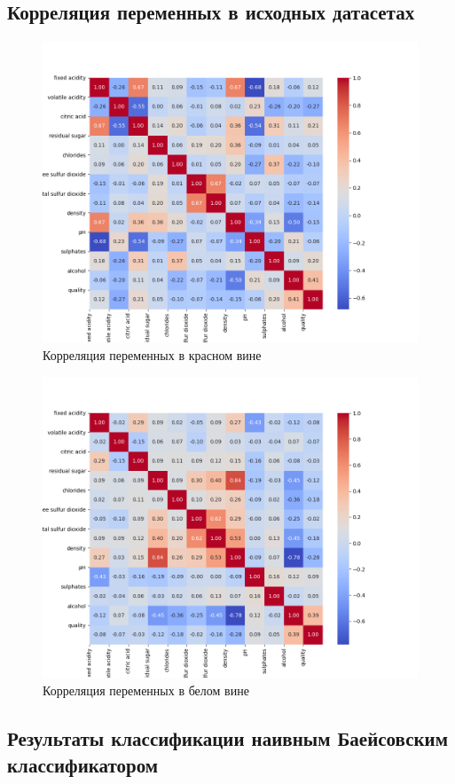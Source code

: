 \documentclass{article}
\begin{document}
\subsection{Корреляция переменных в исходных датасетах}
\begin{figure}[H]
		\centering
		\includegraphics[width = 15cm, height = 9cm]{red_cor.png}
		\caption{Корреляция переменных в красном вине}
	\end{figure}
	
\begin{figure}[H]
		\centering
		\includegraphics[width = 15cm, height = 9cm]{white_cor.png}
		\caption{Корреляция переменных в белом вине}
	\end{figure}
	
\subsection{Результаты классификации наивным Баейсовским классификатором}
	
\end{document}

